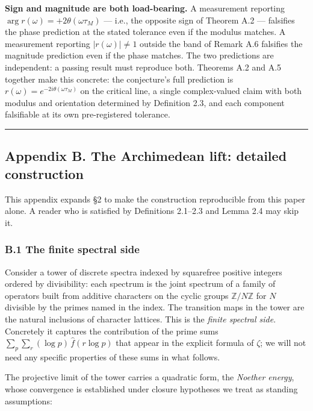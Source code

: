 \documentclass[
  letterpaper,
  11pt]{article}
\theoremstyle{plain}
\theoremstyle{definition}
\theoremstyle{remark}
\begin{document}
\textbf{Sign and magnitude are both load-bearing.} A measurement reporting \(\arg r(\omega) = +2\theta(\omega\tau_M)\) --- i.e., the opposite sign of Theorem A.2 --- falsifies the phase prediction at the stated tolerance even if the modulus matches. A measurement reporting \(|r(\omega)| \neq 1\) outside the band of Remark A.6 falsifies the magnitude prediction even if the phase matches. The two predictions are independent: a passing result must reproduce both. Theorems A.2 and A.5 together make this concrete: the conjecture's full prediction is \(r(\omega) = e^{-2i\theta(\omega\tau_M)}\) on the critical line, a single complex-valued claim with both modulus and orientation determined by Definition 2.3, and each component falsifiable at its own pre-registered tolerance.

\begin{center}\rule{0.5\linewidth}{0.5pt}\end{center}

\subsection{Appendix B. The Archimedean lift: detailed construction}\label{appendix-b.-the-archimedean-lift-detailed-construction}

This appendix expands §2 to make the construction reproducible from this paper alone. A reader who is satisfied by Definitions 2.1--2.3 and Lemma 2.4 may skip it.

\subsubsection{B.1 The finite spectral side}\label{b.1-the-finite-spectral-side}

Consider a tower of discrete spectra indexed by squarefree positive integers ordered by divisibility: each spectrum is the joint spectrum of a family of operators built from additive characters on the cyclic groups \(\mathbb{Z}/N\mathbb{Z}\) for \(N\) divisible by the primes named in the index. The transition maps in the tower are the natural inclusions of character lattices. This is the \emph{finite spectral side}. Concretely it captures the contribution of the prime sums \(\sum_p \sum_r (\log p)\,\hat f(r \log p)\) that appear in the explicit formula of \(\zeta\); we will not need any specific properties of these sums in what follows.

The projective limit of the tower carries a quadratic form, the \emph{Noether energy}, whose convergence is established under closure hypotheses we treat as standing assumptions:
\end{document}
